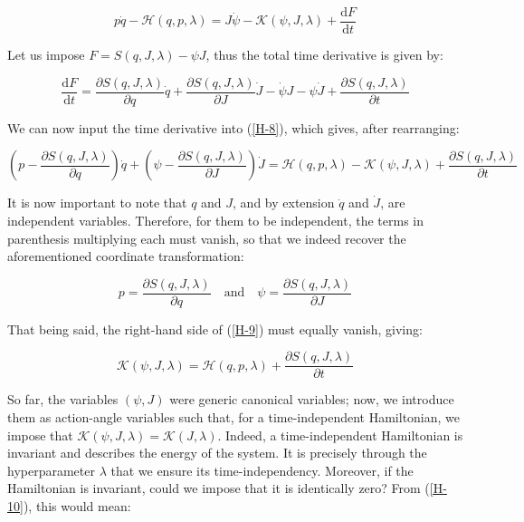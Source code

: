 \begin{equation}
    \label{H-8}
    p\dot{q}-\mathcal{H}\left(q,p,\lambda\right)=J\dot{\psi}-\mathcal{K}\left(\psi,J,\lambda\right)+\frac{\mathrm{d}F}{\mathrm{d}t}
\end{equation}

Let us impose $F=S(q,J,\lambda)-\psi J$, thus the total time derivative is given by:

\begin{equation*}
    \frac{\mathrm{d}F}{\mathrm{d}t}=\frac{\partial S(q,J,\lambda)}{\partial q}\dot{q}+\frac{\partial S(q,J,\lambda)}{\partial J}\dot{J}-\dot{\psi}J-\psi\dot{J}+\frac{\partial S(q,J,\lambda)}{\partial t}
\end{equation*}

We can now input the time derivative into (\ref{H-8}), which gives, after rearranging:

\begin{equation}
    \label{H-9}
    \left(p-\frac{\partial S(q,J,\lambda)}{\partial q}\right)\dot{q}+\left(\psi-\frac{\partial S(q,J,\lambda)}{\partial J}\right)\dot{J}=\mathcal{H}(q,p,\lambda)-\mathcal{K}(\psi,J,\lambda)+\frac{\partial S(q,J,\lambda)}{\partial t} 
\end{equation}

It is now important to note that $q$ and $J$, and by extension $\dot{q}$ and $\dot{J}$, are independent variables. Therefore, for them to be independent, the terms in parenthesis multiplying each must vanish, so that we indeed recover the aforementioned coordinate transformation:

\begin{equation*}
    p=\frac{\partial S(q,J,\lambda)}{\partial q}\quad\text{and}\quad \psi=\frac{\partial S(q,J,\lambda)}{\partial J}
\end{equation*}

That being said, the right-hand side of (\ref{H-9}) must equally vanish, giving:

\begin{equation}
    \label{H-10}
    \mathcal{K}(\psi,J,\lambda)=\mathcal{H}(q,p,\lambda)+\frac{\partial S(q,J,\lambda)}{\partial t}
\end{equation}

So far, the variables $(\psi, J)$ were generic canonical variables; now, we introduce them as action-angle variables such that, for a time-independent Hamiltonian, we impose that $\mathcal{K}(\psi, J,\lambda)=\mathcal{K}(J,\lambda)$. Indeed, a time-independent Hamiltonian is invariant and describes the energy of the system. It is precisely through the hyperparameter $\lambda$ that we ensure its time-independency. Moreover, if the Hamiltonian is invariant, could we impose that it is identically zero? From (\ref{H-10}), this would mean:

